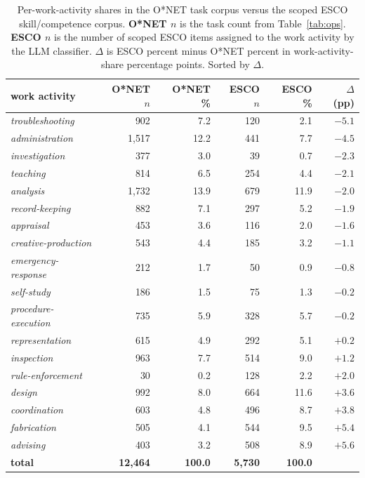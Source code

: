 \documentclass[10pt]{article}
\begin{document}
\begin{table}[!ht]
\caption{Per-work-activity shares in the O{*}NET task corpus versus the
  scoped ESCO skill/competence corpus. \textbf{O{*}NET $n$} is the
  task count from Table~\ref{tab:ops}. \textbf{ESCO $n$} is the number
  of scoped ESCO items assigned to the work activity by the LLM
  classifier. \textbf{$\Delta$} is ESCO percent minus
  O{*}NET percent in work-activity-share percentage points. Sorted by
  $\Delta$.}
\label{tab:esco_mapping}
\centering
\footnotesize
\begin{tabular}{lrrrrr}
\toprule
work activity & O{*}NET $n$ & O{*}NET \% & ESCO $n$ & ESCO \% & $\Delta$ (pp) \\
\midrule
\emph{troubleshooting}      &    902 &  7.2 & 120 &  2.1 & $-5.1$ \\
\emph{administration}       & 1{,}517 & 12.2 & 441 &  7.7 & $-4.5$ \\
\emph{investigation}        &    377 &  3.0 &  39 &  0.7 & $-2.3$ \\
\emph{teaching}             &    814 &  6.5 & 254 &  4.4 & $-2.1$ \\
\emph{analysis}             & 1{,}732 & 13.9 & 679 & 11.9 & $-2.0$ \\
\emph{record-keeping}      &    882 &  7.1 & 297 &  5.2 & $-1.9$ \\
\emph{appraisal}            &    453 &  3.6 & 116 &  2.0 & $-1.6$ \\
\emph{creative-production} &    543 &  4.4 & 185 &  3.2 & $-1.1$ \\
\emph{emergency-response}  &    212 &  1.7 &  50 &  0.9 & $-0.8$ \\
\emph{self-study}          &    186 &  1.5 &  75 &  1.3 & $-0.2$ \\
\emph{procedure-execution}  &    735 &  5.9 & 328 &  5.7 & $-0.2$ \\
\emph{representation}       &    615 &  4.9 & 292 &  5.1 & $+0.2$ \\
\emph{inspection}           &    963 &  7.7 & 514 &  9.0 & $+1.2$ \\
\emph{rule-enforcement}    &     30 &  0.2 & 128 &  2.2 & $+2.0$ \\
\emph{design}               &    992 &  8.0 & 664 & 11.6 & $+3.6$ \\
\emph{coordination}         &    603 &  4.8 & 496 &  8.7 & $+3.8$ \\
\emph{fabrication}          &    505 &  4.1 & 544 &  9.5 & $+5.4$ \\
\emph{advising}             &    403 &  3.2 & 508 &  8.9 & $+5.6$ \\
\midrule
\textbf{total}                & \textbf{12{,}464} & \textbf{100.0} & \textbf{5{,}730} & \textbf{100.0} & \\
\bottomrule
\end{tabular}
\end{table}
\FloatBarrier
\end{document}
